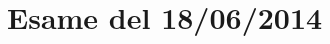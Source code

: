 \documentclass[\main/main.tex]{subfiles}
\begin{document}
\section{Esame del 18/06/2014}

\end{document}
